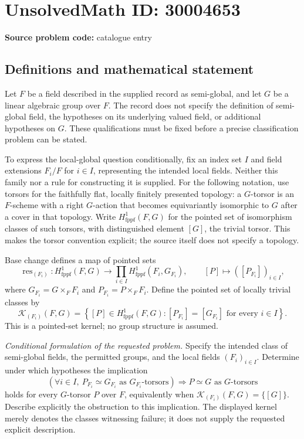 \documentclass[11pt]{article}
\begin{document}
\section*{UnsolvedMath ID: 30004653}
\textbf{Source problem code:} catalogue entry
\subsection{Definitions and mathematical statement}
Let \(F\) be a field described in the supplied record as semi-global, and let \(G\) be a linear algebraic group over \(F\). The record does not specify the definition of semi-global field, the hypotheses on its underlying valued field, or additional hypotheses on \(G\). These qualifications must be fixed before a precise classification problem can be stated.

To express the local-global question conditionally, fix an index set \(I\) and field extensions \(F_i/F\) for \(i\in I\), representing the intended local fields. Neither this family nor a rule for constructing it is supplied. For the following notation, use torsors for the faithfully flat, locally finitely presented topology: a \(G\)-torsor is an \(F\)-scheme with a right \(G\)-action that becomes equivariantly isomorphic to \(G\) after a cover in that topology. Write \(H^1_{\mathrm{fppf}}(F,G)\) for the pointed set of isomorphism classes of such torsors, with distinguished element \([G]\), the trivial torsor. This makes the torsor convention explicit; the source itself does not specify a topology.

Base change defines a map of pointed sets
\[
\operatorname{res}_{(F_i)}:H^1_{\mathrm{fppf}}(F,G)\longrightarrow\prod_{i\in I}H^1_{\mathrm{fppf}}(F_i,G_{F_i}),
\qquad [P]\longmapsto([P_{F_i}])_{i\in I},
\]
where \(G_{F_i}=G\times_F F_i\) and \(P_{F_i}=P\times_F F_i\). Define the pointed set of locally trivial classes by
\[
\mathcal K_{(F_i)}(F,G)=\left\{[P]\in H^1_{\mathrm{fppf}}(F,G):[P_{F_i}]=[G_{F_i}]\text{ for every }i\in I\right\}.
\]
This is a pointed-set kernel; no group structure is assumed.

\emph{Conditional formulation of the requested problem.} Specify the intended class of semi-global fields, the permitted groups, and the local fields \((F_i)_{i\in I}\). Determine under which hypotheses the implication
\[
\left(\forall i\in I,\ P_{F_i}\simeq G_{F_i}\text{ as }G_{F_i}\text{-torsors}\right)
\Longrightarrow P\simeq G\text{ as }G\text{-torsors}
\]
holds for every \(G\)-torsor \(P\) over \(F\), equivalently when \(\mathcal K_{(F_i)}(F,G)=\{[G]\}\). Describe explicitly the obstruction to this implication. The displayed kernel merely denotes the classes witnessing failure; it does not supply the requested explicit description.
\end{document}

